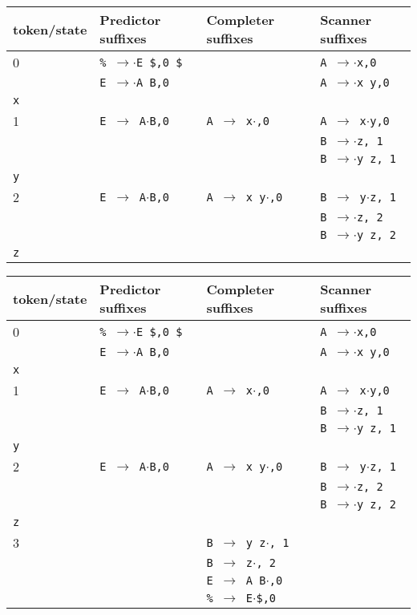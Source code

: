 \documentclass[11pt]{article}
\def\ra{\rightarrow}
\begin{document}
\begin{tabular}{|l|l|l|l|}
\hline
token/state & Predictor suffixes & Completer suffixes & Scanner suffixes\\
\hline
0 & \texttt{\% $\rightarrow$$\cdot$E \$,0 \$} & & \texttt{A $\ra$$\cdot$x,0} \\
  & \texttt{E $\ra$$\cdot$A B,0} & & \texttt{A $\ra$$\cdot$x y,0}\\
\hline
\texttt{x} &  & &\\
\hline
1 & \texttt{E $\ra$ A$\cdot$B,0}& \texttt{A $\ra$ x$\cdot$,0} & \texttt{A $\ra$ x$\cdot$y,0}\\
  & & & \texttt{B $\ra$$\cdot$z, 1}\\
  & & & \texttt{B $\ra$$\cdot$y z, 1}\\
\hline
\texttt{y} &  & &\\
\hline
2 & \texttt{E $\ra$ A$\cdot$B,0} & \texttt{A $\ra$ x y$\cdot$,0} & \texttt{B $\ra$ y$\cdot$z, 1}\\
  &  & & \texttt{B $\ra$$\cdot$z, 2}\\
  &                              & & \texttt{B $\ra$$\cdot$y z, 2}\\
\hline
\texttt{z} &  & &\\
\hline
\end{tabular}

\begin{tabular}{|l|l|l|l|}
\hline
token/state & Predictor suffixes & Completer suffixes & Scanner suffixes\\
\hline
0 & \texttt{\% $\rightarrow$$\cdot$E \$,0 \$} & & \texttt{A $\ra$$\cdot$x,0} \\
  & \texttt{E $\ra$$\cdot$A B,0} & & \texttt{A $\ra$$\cdot$x y,0}\\
\hline
\texttt{x} &  & &\\
\hline
1 & \texttt{E $\ra$ A$\cdot$B,0}& \texttt{A $\ra$ x$\cdot$,0} & \texttt{A $\ra$ x$\cdot$y,0}\\
  & & & \texttt{B $\ra$$\cdot$z, 1}\\
  & & & \texttt{B $\ra$$\cdot$y z, 1}\\
\hline
\texttt{y} &  & &\\
\hline
2 & \texttt{E $\ra$ A$\cdot$B,0} & \texttt{A $\ra$ x y$\cdot$,0} & \texttt{B $\ra$ y$\cdot$z, 1}\\
  &  & & \texttt{B $\ra$$\cdot$z, 2}\\
  &                              & & \texttt{B $\ra$$\cdot$y z, 2}\\
\hline
\texttt{z} &  & &\\
\hline
3 & & \texttt{B $\ra$ y z$\cdot$, 1} & \\
  & & \texttt{B $\ra$ z$\cdot$, 2} & \\
  & & \texttt{E $\ra$ A B$\cdot$,0} &\\
  & & \texttt{\% $\rightarrow$ E$\cdot$\$,0} &\\
\hline
\end{tabular}
\end{document}

